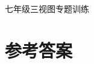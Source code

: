 \documentclass[UTF8,fleqn]{ctexart}
\begin{document}
\begin{center}
{\kaishu{}七年级三视图专题训练}
\end{center}



\begin{enumerate}
\foreachproblem{%
\item%
\label{prob:\thisproblemlabel}
\thisproblem%
}

\end{enumerate}








\renewcommand*{\solutionname}{答案}
\newpage
\showanswers
\section*{参考答案}
\begin{enumerate}
\end{enumerate}
\end{document}
